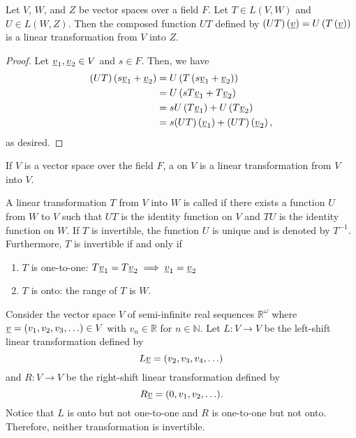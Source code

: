 \begin{theorem}
Let $V$, $W$, and $Z$ be vector spaces over a field $F$.
Let $T \in L(V,W)$ and $U \in L(W,Z)$.
Then the composed function $UT$ defined by $(UT) \left( \underline{v} \right) = U \left( T \left( \underline{v} \right) \right)$ is a linear transformation from $V$ into $Z$.
\end{theorem}
\begin{proof}
Let $\underline{v}_1, \underline{v}_2 \in V$ and $s \in F$.
Then, we have
\begin{equation*}
\begin{split}
(UT) \left( s \underline{v}_1 + \underline{v}_2 \right)
&= U \left( T \left( s \underline{v}_1 + \underline{v}_2 \right) \right) \\
&= U \left( s T \underline{v}_1 + T \underline{v}_2 \right) \\
&= s U \left( T \underline{v}_1 \right) + U \left( T \underline{v}_2 \right) \\
&= s (UT) \left( \underline{v}_1 \right) + (UT) \left( \underline{v}_2 \right) ,
\end{split}
\end{equation*}
as desired.
\end{proof}

\begin{definition}
If $V$ is a vector space over the field $F$, a  on $V$ is a linear transformation from $V$ into $V$.
\end{definition}

\begin{definition}
A linear transformation $T$ from $V$ into $W$ is called  if there exists a function $U$ from $W$ to $V$ such that $UT$ is the identity function on $V$ and $TU$ is the identity function on $W$.
If $T$ is invertible, the function $U$ is unique and is denoted by $T^{-1}$.
Furthermore, $T$ is invertible if and only if
\begin{enumerate}
\item $T$ is one-to-one: $T \underline{v}_1 = T \underline{v}_2 \implies \underline{v}_1 = \underline{v}_2$
\item $T$ is onto: the range of $T$ is $W$.
\end{enumerate}
\end{definition}

\begin{example}
Consider the vector space $V$ of semi-infinite real sequences $\mathbb{R}^\omega$ where $\underline{v} = (v_1,v_2,v_3,\ldots)\in V$ with $v_n \in \mathbb{R}$ for $n\in \mathbb{N}$.
Let $L: V \rightarrow V$ be the left-shift linear transformation defined by
\[L \underline{v} = (v_2,v_3,v_4,\ldots) \]
and $R: V \rightarrow V$ be the right-shift linear transformation defined by
\[R \underline{v} = (0,v_1,v_2,\ldots). \]
Notice that $L$ is onto but not one-to-one and $R$ is one-to-one but not onto.
Therefore, neither transformation is invertible.
\end{example}

